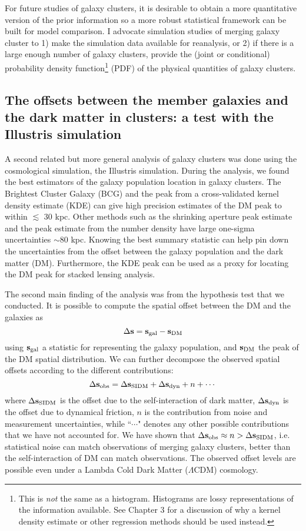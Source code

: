 For future studies of galaxy clusters, 
it is desirable to obtain a more quantitative version of the 
prior information so a more robust statistical framework can be built for model
comparison. 
I advocate simulation studies of merging galaxy cluster  
to 1) make the simulation data available for reanalysis, or 2) if there is a large
enough number of galaxy clusters, provide the
(joint or conditional) probability density function\footnote{This is {\it not}
the same as a histogram. Histograms are lossy representations of the information 
available. See Chapter 3 for a discussion of why a kernel density estimate or
other regression methods should be used instead.} (PDF) of the physical quantities
of galaxy clusters. 

\subsection{The offsets between the member galaxies and the dark
matter in clusters: a test with the Illustris simulation}
A second related but more general analysis of galaxy clusters was done using the
cosmological simulation, the Illustris simulation. 
During the analysis, we found the best 
estimators of the galaxy population location in galaxy clusters. 
The Brightest Cluster
Galaxy (BCG) and the peak from a cross-validated kernel density estimate (KDE)
can give high precision estimates of the DM peak to within $\lesssim$ 30 kpc.
Other methods such as the shrinking aperture peak estimate and the peak estimate 
from the number density have large one-sigma uncertainties $\sim 80$ kpc.   
Knowing the best summary statistic can help pin down the uncertainties from  
the offset between the galaxy population and the dark matter (DM). Furthermore,
the KDE peak can be used as a proxy for locating the DM peak for stacked
lensing analysis.  

The second main finding of the analysis was from the hypothesis test that we
conducted.
It is possible to compute the spatial 
offset between the DM and the galaxies as 
\begin{equation}
	\Delta {\bf s} =  {\bf s}_{\rm gal} - {\bf s}_{\rm DM}
\end{equation}
using ${\bf s}_{\rm gal}$ a statistic for representing the galaxy population,
and ${\bf s}_{\rm DM}$ the peak of the DM spatial distribution.
We can further decompose the observed spatial offsets according to the different
contributions: 
\begin{equation}
	\Delta {\bf s}_{\rm obs} = \Delta {\bf s}_{\mathrm{SIDM}} + \Delta {\bf s}_{\rm dyn} + n + \cdots
\end{equation}
where $\Delta {\bf s}_{\mathrm{SIDM}}$ is the offset due to the self-interaction of dark matter, 
$\Delta {\bf s}_{\rm dyn}$ is the offset due to dynamical friction, $n$ is the
contribution from noise and measurement uncertainties, while ``$\cdots$" denotes
any other possible contributions that we have not accounted for. 
We have shown that $\Delta {\bf s}_{\rm obs} \approx  n  > \Delta {\bf s}_{\mathrm{SIDM}}$, i.e. 
statistical noise can match observations of merging galaxy clusters, better than 
the self-interaction of DM can match observations. 
The observed offset levels are possible even under  
a Lambda Cold Dark Matter ($\Lambda$CDM) cosmology. 

